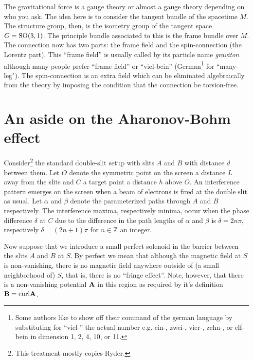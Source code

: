 \documentclass[12pt]{article}
\begin{document}
The gravitational force is a gauge theory or almost a gauge theory depending on who you ask. The idea here is to consider the tangent bundle of the spacetime $M$. The structure group, then, is the isometry group of the tangent space $G={\rm SO}({3,1})$. The principle bundle associated to this is the frame bundle over $M$. The connection now has two parts: the frame field and the spin-connection (the Lorentz part). This ``frame field'' is usually called by its particle name {\em graviton} although many people prefer ``frame field'' or ``viel-bein'' (German\footnote{Some authors like to show off their command of the german language by substituting for ``viel-'' the actual number e.g. ein-, zwei-, vier-, zehn-, or elf-bein in dimension 1, 2, 4, 10, or 11.} for ``many-leg"). The spin-connection is an extra field which can be eliminated algebraically from the theory by imposing the condition that the connection be torsion-free.





\section{An aside on the Aharonov-Bohm effect}

Consider\footnote{This treatment mostly copies Ryder.} the standard double-slit setup with slits $A$ and $B$ with distance $d$ between them. Let $O$ denote the symmetric point on the screen a distance $L$ away from the slits and $C$ a target point a distance $h$ above $O$. An interference pattern emerges on the screen when a beam of electrons is fired at the double slit as usual. Let $\alpha$ and $\beta$ denote the parameterized paths through $A$ and $B$ respectively. The interference maxima, respectively minima, occur when the phase difference $\delta$ at $C$ due to the difference in the path lengths of $\alpha$ and $\beta$ is $\delta=2 n \pi$, respectively $\delta = (2n+1)\pi$ for $n\in \mathbb Z$ an integer.

Now suppose that we introduce a small perfect solenoid in the barrier between the slits $A$ and $B$ at $S$. By perfect we mean that although the magnetic field at $S$ is non-vanishing, there is no magnetic field anywhere outside of (a small neighborhood of) $S$, that is, there is no ``fringe effect''. Note, however, that there is a non-vanishing potential $\bf A$ in this region as required by it's definition ${\bf B}={\rm curl} \bf A$. 
\end{document}
